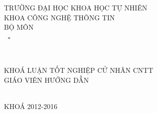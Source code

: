 \begin{titlepage}

\begin{center}
TRƯỜNG ĐẠI HỌC KHOA HỌC TỰ NHIÊN\\
KHOA CÔNG NGHỆ THÔNG TIN\\
BỘ MÔN \MakeUppercase{\tenBM}\\[2cm]

{ \LARGE \bfseries \MakeUppercase{\tenSV ~-~ \mssv} \\[1cm] } 

{ \LARGE \bfseries \MakeUppercase{\tenKL} \\[2cm] } %

\Large KHOÁ LUẬN TỐT NGHIỆP CỬ NHÂN CNTT\\[2cm]

\Large GIÁO VIÊN HƯỚNG DẪN\\
\MakeUppercase{\tenGVHD} \\[2cm]


\vfill
KHOÁ 2012-2016

\end{center}

\end{titlepage}